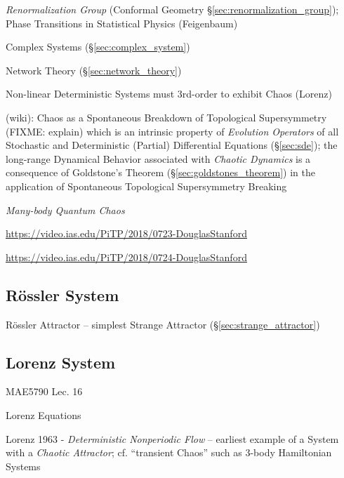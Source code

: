 \emph{Renormalization Group} (Conformal Geometry
\S\ref{sec:renormalization_group}); Phase Transitions in Statistical Physics
(Feigenbaum)

Complex Systems (\S\ref{sec:complex_system})

Network Theory (\S\ref{sec:network_theory})

Non-linear Deterministic Systems must 3rd-order to exhibit Chaos (Lorenz)

(wiki): Chaos as a Spontaneous Breakdown of Topological Supersymmetry (FIXME:
explain) which is an intrinsic property of \emph{Evolution Operators} of all
Stochastic and Deterministic (Partial) Differential Equations (\S\ref{sec:sde});
the long-range Dynamical Behavior associated with \emph{Chaotic Dynamics} is a
consequence of Goldstone's Theorem (\S\ref{sec:goldstones_theorem}) in the
application of Spontaneous Topological Supersymmetry Breaking

\asterism


\emph{Many-body Quantum Chaos}

\url{https://video.ias.edu/PiTP/2018/0723-DouglasStanford}

\url{https://video.ias.edu/PiTP/2018/0724-DouglasStanford}



\subsection{R\"ossler System}\label{sec:rossler_system}

R\"ossler Attractor --
simplest Strange Attractor (\S\ref{sec:strange_attractor})



\subsection{Lorenz System}\label{sec:lorenz_system}

MAE5790 Lec. 16

Lorenz Equations

Lorenz 1963 - \emph{Deterministic Nonperiodic Flow} -- earliest example of a
System with a \emph{Chaotic Attractor}; cf. ``transient Chaos'' such as 3-body
Hamiltonian Systems

